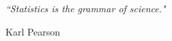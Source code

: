 \documentclass[11pt, oneside]{Thesis} %
\begin{document}
\pagestyle{empty} %

\null\vfill %

\textit{``Statistics is the grammar of science."}

\begin{flushright}
Karl Pearson
\end{flushright}

\vfill\vfill\vfill\vfill\vfill\vfill\null %

\clearpage %


\end{document}
